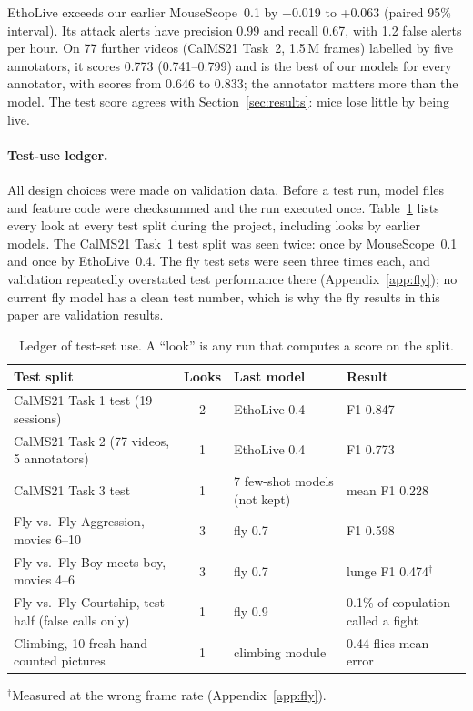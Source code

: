 \documentclass[10pt]{article}
\begin{document}
EthoLive exceeds our earlier MouseScope~0.1 by +0.019 to +0.063 (paired 95\% interval). Its attack alerts have precision 0.99 and recall 0.67, with 1.2 false alerts per hour. On 77 further videos (CalMS21 Task~2, 1.5\,M frames) labelled by five annotators, it scores 0.773 (0.741--0.799) and is the best of our models for every annotator, with scores from 0.646 to 0.833; the annotator matters more than the model. The test score agrees with Section~\ref{sec:results}: mice lose little by being live.

\paragraph{Test-use ledger.} All design choices were made on validation data. Before a test run, model files and feature code were checksummed and the run executed once. Table~\ref{tab:ledger} lists every look at every test split during the project, including looks by earlier models. The CalMS21 Task~1 test split was seen twice: once by MouseScope~0.1 and once by EthoLive~0.4. The fly test sets were seen three times each, and validation repeatedly overstated test performance there (Appendix~\ref{app:fly}); no current fly model has a clean test number, which is why the fly results in this paper are validation results.

\begin{table}[t]
\centering
\caption{Ledger of test-set use. A ``look'' is any run that computes a score on the split.}
\label{tab:ledger}
\begin{tabular}{lcll}
\toprule
Test split & Looks & Last model & Result \\
\midrule
CalMS21 Task 1 test (19 sessions) & 2 & EthoLive 0.4 & F1 0.847 \\
CalMS21 Task 2 (77 videos, 5 annotators) & 1 & EthoLive 0.4 & F1 0.773 \\
CalMS21 Task 3 test & 1 & 7 few-shot models (not kept) & mean F1 0.228 \\
Fly vs.\ Fly Aggression, movies 6--10 & 3 & fly 0.7 & F1 0.598 \\
Fly vs.\ Fly Boy-meets-boy, movies 4--6 & 3 & fly 0.7 & lunge F1 0.474$^\dagger$ \\
Fly vs.\ Fly Courtship, test half (false calls only) & 1 & fly 0.9 & 0.1\% of copulation called a fight \\
Climbing, 10 fresh hand-counted pictures & 1 & climbing module & 0.44 flies mean error \\
\bottomrule
\end{tabular}

\smallskip
{\footnotesize $^\dagger$Measured at the wrong frame rate (Appendix~\ref{app:fly}).}
\end{table}
\end{document}
